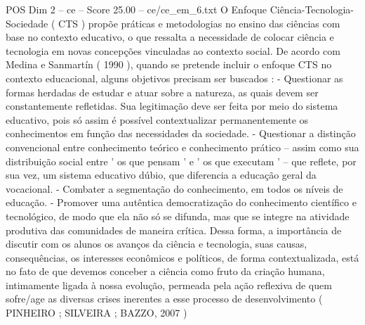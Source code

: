 \begin{textsample}{POS Dim 2 – ce – Score 25.00 – ce/ce\_em\_6.txt}
O Enfoque Ciência-Tecnologia-Sociedade ( CTS ) propõe práticas e metodologias no ensino das ciências com base no contexto educativo, o que ressalta a necessidade de colocar ciência e tecnologia em novas concepções vinculadas ao contexto social.
De acordo com Medina e Sanmartín ( 1990 ), quando se pretende incluir o enfoque CTS no contexto educacional, alguns objetivos precisam ser buscados : - Questionar as formas herdadas de estudar e atuar sobre a natureza, as quais devem ser constantemente refletidas.
Sua legitimação deve ser feita por meio do sistema educativo, pois só assim é possível contextualizar permanentemente os conhecimentos em função das necessidades da sociedade. - Questionar a distinção convencional entre conhecimento teórico e conhecimento prático – assim como sua distribuição social entre ' os que pensam ' e ' os que executam ' – que reflete, por sua vez, um sistema educativo dúbio, que diferencia a educação geral da vocacional. - Combater a segmentação do conhecimento, em todos os níveis de educação. - Promover uma autêntica democratização do conhecimento científico e tecnológico, de modo que ela não só se difunda, mas que se integre na atividade produtiva das comunidades de maneira crítica.
Dessa forma, a importância de discutir com os alunos os avanços da ciência e tecnologia, suas causas, consequências, os interesses econômicos e políticos, de forma contextualizada, está no fato de que devemos conceber a ciência como fruto da criação humana, intimamente ligada à nossa evolução, permeada pela ação reflexiva de quem sofre/age as diversas crises inerentes a esse processo de desenvolvimento ( PINHEIRO ; SILVEIRA ; BAZZO, 2007 )

\end{textsample}
